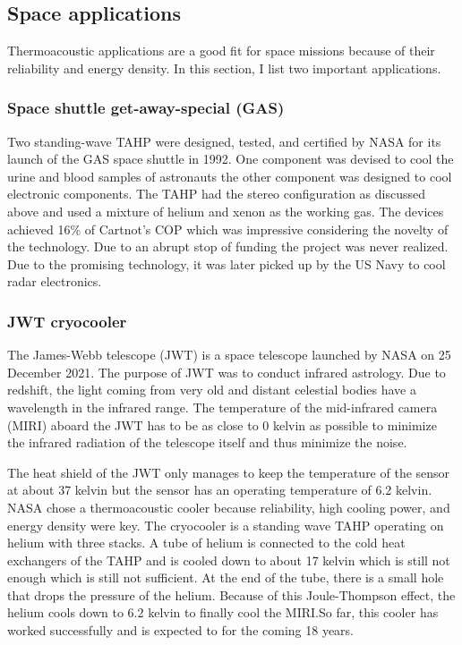 \documentclass{article}
\newcommand{\newpara}
    {
      \bigbreak{}
      \noindent
    }
\begin{document}
\subsection{Space applications}
Thermoacoustic applications are a good fit for space missions because of their reliability and energy density. In this section, I list two important applications.
\subsubsection{Space shuttle get-away-special (GAS)\cite{AdeffSpace,powerofsound}}
Two standing-wave TAHP were designed, tested, and certified by NASA for its launch of the GAS space shuttle in 1992. One component was devised to cool the urine and blood samples of astronauts the other component was designed to cool electronic components. The TAHP had the stereo configuration as discussed above and used a mixture of helium and xenon as the working gas. The devices achieved 16\% of Cartnot's COP which was impressive considering the novelty of the technology. Due to an abrupt stop of funding the project was never realized. Due to the promising technology, it was later picked up by the US Navy to cool radar electronics.
\subsubsection{JWT cryocooler\cite{Petach2014MidII,Moore_2017,ross2022conceptual}}
The James-Webb telescope (JWT) is a space telescope launched by NASA on 25 December 2021. The purpose of JWT was to conduct infrared astrology. Due to redshift, the light coming from very old and distant celestial bodies have a wavelength in the infrared range. The temperature of the mid-infrared camera (MIRI) aboard the JWT has to be as close to 0 kelvin as possible to minimize the infrared radiation of the telescope itself and thus minimize the noise.
\newpara{}
The heat shield of the JWT only manages to keep the temperature of the sensor at about 37 kelvin but the sensor has an operating temperature of 6.2 kelvin. NASA chose a thermoacoustic cooler because reliability, high cooling power, and energy density were key. The cryocooler is a standing wave TAHP operating on helium with three stacks. A tube of helium is connected to the cold heat exchangers of the TAHP and is cooled down to about 17 kelvin which is still not enough which is still not sufficient. At the end of the tube, there is a small hole that drops the pressure of the helium. Because of this Joule-Thompson effect, the helium cools down to 6.2 kelvin to finally cool the MIRI.\@ So far, this cooler has worked successfully and is expected to for the coming 18 years.
\end{document}
